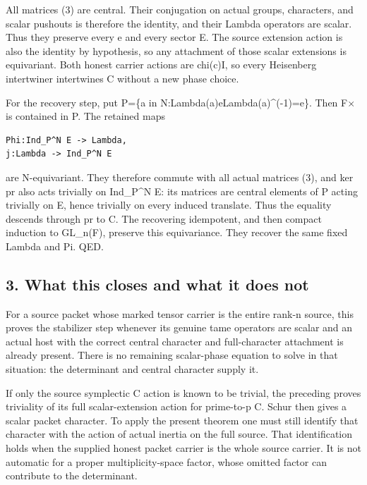 All matrices (3) are central. Their conjugation on actual groups,
characters, and scalar pushouts is therefore the identity, and their
Lambda operators are scalar. Thus they preserve every e and every sector
E. The source extension action is also the identity by hypothesis, so
any attachment of those scalar extensions is equivariant. Both honest
carrier actions are chi(c)I, so every Heisenberg intertwiner intertwines
C without a new phase choice.

For the recovery step, put P=\{a in N:Lambda(a)eLambda(a)\^{}(-1)=e\}.
Then F× is contained in P. The retained maps

\begin{Verbatim}[fontsize=\small,breaklines=true,breakanywhere=true]
Phi:Ind_P^N E -> Lambda,
j:Lambda -> Ind_P^N E
\end{Verbatim}

are N-equivariant. They therefore commute with all actual matrices (3),
and ker pr also acts trivially on Ind\_P\^{}N E: its matrices are
central elements of P acting trivially on E, hence trivially on every
induced translate. Thus the equality descends through pr to C. The
recovering idempotent, and then compact induction to GL\_n(F), preserve
this equivariance. They recover the same fixed Lambda and Pi. QED.

\hypertarget{odd_scalar-what-this-closes-and-what-it-does-not}{%
\subsection{3. What this closes and what it does
not}\label{odd_scalar-what-this-closes-and-what-it-does-not}}

For a source packet whose marked tensor carrier is the entire rank-n
source, this proves the stabilizer step whenever its genuine tame
operators are scalar and an actual host with the correct central
character and full-character attachment is already present. There is no
remaining scalar-phase equation to solve in that situation: the
determinant and central character supply it.

If only the source symplectic C action is known to be trivial, the
preceding  proves triviality of its
full scalar-extension action for prime-to-p C. Schur then gives a scalar
packet character. To apply the present theorem one must still identify
that character with the action of actual inertia on the full source.
That identification holds when the supplied honest packet carrier is the
whole source carrier. It is not automatic for a proper
multiplicity-space factor, whose omitted factor can contribute to the
determinant.

